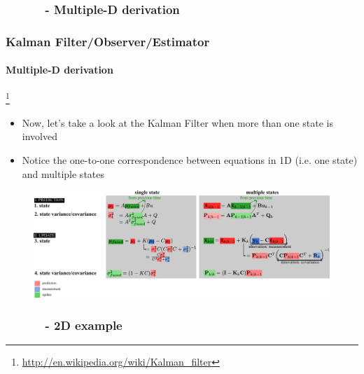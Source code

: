 \documentclass{beamer}
\newenvironment{changemargin}[2]
	{
	  	\begin{list}{}
		{
			\setlength{\topsep}{0pt}%
			\setlength{\leftmargin}{#1}%
			\setlength{\rightmargin}{#2}%
			\setlength{\listparindent}{\parindent}%
			\setlength{\itemindent}{\parindent}%
			\setlength{\parsep}{\parskip}%
		}
	  	\item[]
		}
		{\end{list}
	}
\begin{document}
\subsubsection{\ \ \ \ \ \ - Multiple-D derivation}
\begin{frame}[plain]
\frametitle{Kalman Filter/Observer/Estimator}
\framesubtitle{Multiple-D derivation}

\footnote{\tiny\hspace{-0.23in} \hspace{-0.24in} \href{http://en.wikipedia.org/wiki/Kalman_filter}{http://en.wikipedia.org/wiki/Kalman\_filter}}
\begin{changemargin}{-1.4in}{0in}
\begin{itemize}\scriptsize
\item Now, let's take a look at the Kalman Filter when more than one state is involved
\item Notice the one-to-one correspondence between equations in 1D (i.e. one state) and multiple states
\end{itemize}
\begin{figure}[h]
\centering
\includegraphics[width=1.4\textwidth]{figs/TRK_KalmanFilter_equations-2D.pdf}
\end{figure}
\end{changemargin}
\end{frame}


\subsubsection{\ \ \ \ \ \ - 2D example}
\end{document}
